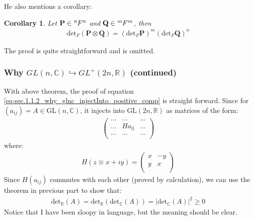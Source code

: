 \documentclass{article}
\numberwithin{equation}{subsection} %
\newtheorem{coro}{Corollary}[section]
\theoremstyle{definition}
\begin{document}
        He also mentions a corollary:
        \begin{coro}
            Let $\mathbf{P}\in \tensor[^n]{F}{^n}$ and $\mathbf{Q}\in
            \tensor[^m]{F}{^m}$, then
            \begin{align}
                \text{det}_F (\mathbf{P\otimes Q}) =
                (\text{det}_F \mathbf{P}) ^m (\text{det}_F \mathbf{Q})^n
            \end{align}
        \end{coro}

        The proof is quite straightforward and is omitted.

        \subsubsection{Why \texorpdfstring{
                $GL(n, \mathbb{C}) \hookrightarrow GL^+(2n,\mathbb{R})$
                }{}(continued)
            }
        With above theorem, the proof of equation 
        \ref{eq:sec.1.1.2_why_glnc_injectInto_positive_comp} 
        is straight forward. Since for 
        $(a_{ij})= A\in \mathrm{GL}(n,\mathbb{C})$, it injects into
        $\mathrm{GL}(2n,\mathbb{R})$ as matrices of the form:
        \begin{align*}
            \left( \begin{array}{ccc}
             \text{...} & \text{...} & \text{...} \\
             \text{...} & H a_{\text{ij}} & \text{...} \\
             \text{...} & \text{...} & \text{...} \\
            \end{array} \right)
        \end{align*}
        where:
        \begin{align*}
            H(z\equiv x+iy)=\left( \begin{array}{cc}
                    x & -y \\
                    y & x \\
            \end{array}\right)
        \end{align*}
        Since $H(a_{ij})$ commutes with each other (proved by calculation),
        we can use the theorem in previous part to show that:
        \begin{align*}
            \mathrm{det_\mathbb{R}}(A) =
            \mathrm{det_\mathbb{R}}  (\mathrm{det_\mathbb{C}}(A))
            = |\mathrm{det_\mathbb{C}}(A) |^2 \geq 0
        \end{align*}
        Notice that I have been sloopy in language, but the meaning should
        be clear.
\end{document}
